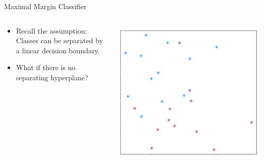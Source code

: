 \begin{frame}{Maximal Margin Classifier}
\begin{columns}
  \begin{column}{0.5\textwidth}
    \begin{itemize}
      \item Recall the assumption: Classes can be separated by a linear decision boundary.
      \item What if there is no separating hyperplane?
    \end{itemize}
  \end{column}
  \begin{column}{0.5\textwidth}
    \includegraphics[width=\linewidth]{images/support-vector-machines/support-vector-machines-9.png}
  \end{column}
\end{columns}
\end{frame}


